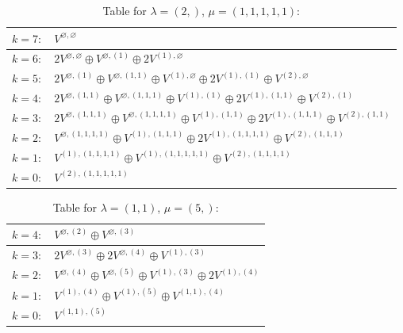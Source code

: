 \documentclass[a4paper,12pt]{article}
\begin{document}
\renewcommand{\arraystretch}{1.6} 
\begin{table}[H]
\centering
\caption{Table for $\lambda = (2,)$, $\mu = (1, 1, 1, 1, 1)$:}
\begin{tabular}{|>{\centering\arraybackslash}p{15cm}|}
\hline
 $k = 7: \quad V^{\varnothing, \varnothing} $ \\ \hline
 $k = 6: \quad 2 V^{\varnothing, \varnothing} \oplus V^{\varnothing, (1)} \oplus 2 V^{(1), \varnothing} $ \\ \hline
 $k = 5: \quad 2 V^{\varnothing, (1)} \oplus V^{\varnothing, (1, 1)} \oplus V^{(1), \varnothing} \oplus 2 V^{(1), (1)} \oplus V^{(2), \varnothing} $ \\ \hline
 $k = 4: \quad 2 V^{\varnothing, (1, 1)} \oplus V^{\varnothing, (1, 1, 1)} \oplus V^{(1), (1)} \oplus 2 V^{(1), (1, 1)} \oplus V^{(2), (1)} $ \\ \hline
 $k = 3: \quad 2 V^{\varnothing, (1, 1, 1)} \oplus V^{\varnothing, (1, 1, 1, 1)} \oplus V^{(1), (1, 1)} \oplus 2 V^{(1), (1, 1, 1)} \oplus V^{(2), (1, 1)} $ \\ \hline
 $k = 2: \quad V^{\varnothing, (1, 1, 1, 1)} \oplus V^{(1), (1, 1, 1)} \oplus 2 V^{(1), (1, 1, 1, 1)} \oplus V^{(2), (1, 1, 1)} $ \\ \hline
 $k = 1: \quad V^{(1), (1, 1, 1, 1)} \oplus V^{(1), (1, 1, 1, 1, 1)} \oplus V^{(2), (1, 1, 1, 1)} $ \\ \hline
 $k = 0: \quad V^{(2), (1, 1, 1, 1, 1)} $ \\ \hline
\end{tabular}
\end{table}

\renewcommand{\arraystretch}{1.6} 
\begin{table}[H]
\centering
\caption{Table for $\lambda = (1, 1)$, $\mu = (5,)$:}
\begin{tabular}{|>{\centering\arraybackslash}p{15cm}|}
\hline
 $k = 4: \quad V^{\varnothing, (2)} \oplus V^{\varnothing, (3)} $ \\ \hline
 $k = 3: \quad 2 V^{\varnothing, (3)} \oplus 2 V^{\varnothing, (4)} \oplus V^{(1), (3)} $ \\ \hline
 $k = 2: \quad V^{\varnothing, (4)} \oplus V^{\varnothing, (5)} \oplus V^{(1), (3)} \oplus 2 V^{(1), (4)} $ \\ \hline
 $k = 1: \quad V^{(1), (4)} \oplus V^{(1), (5)} \oplus V^{(1, 1), (4)} $ \\ \hline
 $k = 0: \quad V^{(1, 1), (5)} $ \\ \hline
\end{tabular}
\end{table}
\end{document}
